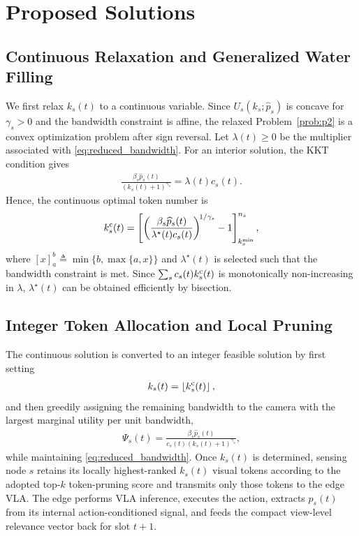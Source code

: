 \documentclass[lettersize,journal]{IEEEtran}
\theoremstyle{custom}
\begin{document}
\section{Proposed Solutions}
\subsection{Continuous Relaxation and Generalized Water Filling}
We first relax $k_s(t)$ to a continuous variable. Since $U_s(k_s;\widehat p_s)$ is concave for $\gamma_s>0$ and the bandwidth constraint is affine, the relaxed Problem~\ref{prob:p2} is a convex optimization problem after sign reversal. Let $\lambda(t)\geq0$ be the multiplier associated with \eqref{eq:reduced_bandwidth}. For an interior solution, the KKT condition gives
\begin{align}
    \frac{\beta_s\widehat p_s(t)}{(k_s(t)+1)^{\gamma_s}}
    =\lambda(t)c_s(t).
\end{align}
Hence, the continuous optimal token number is
\begin{align}\label{eq:waterfill}
    k_s^{\rm c}(t)
    =\left[
    \left(
    \frac{\beta_s\widehat p_s(t)}{\lambda^\star(t)c_s(t)}
    \right)^{\!1/\gamma_s}-1
    \right]_{k_s^{\min}}^{n_s},
\end{align}
where $[x]_a^b\triangleq\min\{b,\max\{a,x\}\}$ and $\lambda^\star(t)$ is selected such that the bandwidth constraint is met. Since $\sum_s c_s(t)k_s^{\rm c}(t)$ is monotonically non-increasing in $\lambda$, $\lambda^\star(t)$ can be obtained efficiently by bisection.

\subsection{Integer Token Allocation and Local Pruning}
The continuous solution is converted to an integer feasible solution by first setting
\begin{align}
    k_s(t)=\left\lfloor k_s^{\rm c}(t)\right\rfloor,
\end{align}
and then greedily assigning the remaining bandwidth to the camera with the largest marginal utility per unit bandwidth,
\begin{align}\label{eq:greedy_index}
    \Psi_s(t)=
    \frac{\beta_s\widehat p_s(t)}{c_s(t)(k_s(t)+1)^{\gamma_s}},
\end{align}
while maintaining \eqref{eq:reduced_bandwidth}. Once $k_s(t)$ is determined, sensing node $s$ retains its locally highest-ranked $k_s(t)$ visual tokens according to the adopted top-$k$ token-pruning score and transmits only those tokens to the edge VLA. The edge performs VLA inference, executes the action, extracts $p_s(t)$ from its internal action-conditioned signal, and feeds the compact view-level relevance vector back for slot $t+1$.
\end{document}
